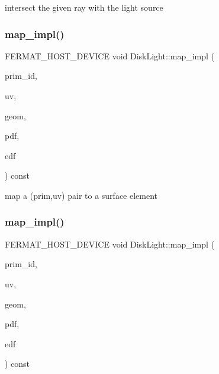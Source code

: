 intersect the given ray with the light source \mbox{\label{struct_disk_light_a7be348de13a69241954e8780aad94da9}} 
\subsubsection{\texorpdfstring{map\+\_\+impl()}{map\_impl()}\hspace{0.1cm}{\footnotesize\ttfamily [1/2]}}
{\footnotesize\ttfamily F\+E\+R\+M\+A\+T\+\_\+\+H\+O\+S\+T\+\_\+\+D\+E\+V\+I\+CE void Disk\+Light\+::map\+\_\+impl (\begin{DoxyParamCaption}\item[{const uint32\+\_\+t}]{prim\+\_\+id,  }\item[{const \hyperlink{structcugar_1_1_vector}{cugar\+::\+Vector2f} \&}]{uv,  }\item[{\hyperlink{struct_vertex_geometry}{Vertex\+Geometry} $\ast$}]{geom,  }\item[{float $\ast$}]{pdf,  }\item[{\hyperlink{struct_edf}{Edf} $\ast$}]{edf }\end{DoxyParamCaption}) const\hspace{0.3cm}{\ttfamily [inline]}}

map a (prim,uv) pair to a surface element \mbox{\label{struct_disk_light_addaaf579434c189bfd0b3f0ded4762d7}} 
\subsubsection{\texorpdfstring{map\+\_\+impl()}{map\_impl()}\hspace{0.1cm}{\footnotesize\ttfamily [2/2]}}
{\footnotesize\ttfamily F\+E\+R\+M\+A\+T\+\_\+\+H\+O\+S\+T\+\_\+\+D\+E\+V\+I\+CE void Disk\+Light\+::map\+\_\+impl (\begin{DoxyParamCaption}\item[{const uint32\+\_\+t}]{prim\+\_\+id,  }\item[{const \hyperlink{structcugar_1_1_vector}{cugar\+::\+Vector2f} \&}]{uv,  }\item[{const \hyperlink{struct_vertex_geometry}{Vertex\+Geometry} \&}]{geom,  }\item[{float $\ast$}]{pdf,  }\item[{\hyperlink{struct_edf}{Edf} $\ast$}]{edf }\end{DoxyParamCaption}) const\hspace{0.3cm}{\ttfamily [inline]}}

